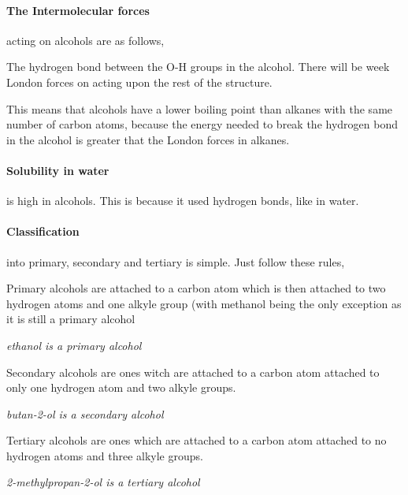 	\paragraph{The Intermolecular forces} acting on alcohols are as follows,
	
	The hydrogen bond between the O-H groups in the alcohol. There will be week London forces on acting upon the rest of the structure.
	
	This means that alcohols have a lower boiling point than alkanes with the same number of carbon atoms, because the energy needed to break the hydrogen bond in the alcohol is greater that the London forces in alkanes.
	
	\paragraph{Solubility in water} is high in alcohols. This is because it used hydrogen bonds, like in water.
	
	\paragraph{Classification} into primary, secondary and tertiary is simple. Just follow these rules,
	
	Primary alcohols are attached to a carbon atom which is then attached to two hydrogen atoms and one alkyle group (with methanol being the only exception as it is still a primary alcohol
	\begin{center}
		
		\vspace{7mm}
		
		\textit{ethanol is a primary alcohol}
	\end{center}
	
	Secondary alcohols are ones witch are attached to a carbon atom attached to only one hydrogen atom and two alkyle groups.
	\begin{center}
		
		\vspace{7mm}
		
		\textit{butan-2-ol is a secondary alcohol}
	\end{center}
	
	Tertiary alcohols are ones which are attached to a carbon atom attached to no hydrogen atoms and three alkyle groups.
	\begin{center}
		
		\vspace{7mm}
		
		\textit{2-methylpropan-2-ol is a tertiary alcohol}
	\end{center}
	
